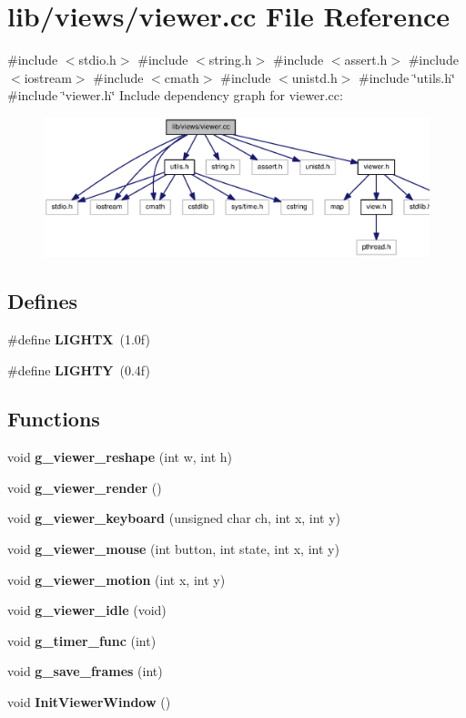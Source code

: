 \section{lib/views/viewer.cc \-File \-Reference}
\label{viewer_8cc}
{\ttfamily \#include $<$stdio.\-h$>$}\*
{\ttfamily \#include $<$string.\-h$>$}\*
{\ttfamily \#include $<$assert.\-h$>$}\*
{\ttfamily \#include $<$iostream$>$}\*
{\ttfamily \#include $<$cmath$>$}\*
{\ttfamily \#include $<$unistd.\-h$>$}\*
{\ttfamily \#include \char`\"{}utils.\-h\char`\"{}}\*
{\ttfamily \#include \char`\"{}viewer.\-h\char`\"{}}\*
\-Include dependency graph for viewer.\-cc\-:
\nopagebreak
\begin{figure}[H]
\begin{center}
\leavevmode
\includegraphics[width=350pt]{viewer_8cc__incl}
\end{center}
\end{figure}
\subsection*{\-Defines}
\begin{DoxyCompactItemize}
\item 
\#define {\bf \-L\-I\-G\-H\-T\-X}~(1.\-0f)
\item 
\#define {\bf \-L\-I\-G\-H\-T\-Y}~(0.\-4f)
\end{DoxyCompactItemize}
\subsection*{\-Functions}
\begin{DoxyCompactItemize}
\item 
void {\bf g\-\_\-viewer\-\_\-reshape} (int w, int h)
\item 
void {\bf g\-\_\-viewer\-\_\-render} ()
\item 
void {\bf g\-\_\-viewer\-\_\-keyboard} (unsigned char ch, int x, int y)
\item 
void {\bf g\-\_\-viewer\-\_\-mouse} (int button, int state, int x, int y)
\item 
void {\bf g\-\_\-viewer\-\_\-motion} (int x, int y)
\item 
void {\bf g\-\_\-viewer\-\_\-idle} (void)
\item 
void {\bf g\-\_\-timer\-\_\-func} (int)
\item 
void {\bf g\-\_\-save\-\_\-frames} (int)
\item 
void {\bf \-Init\-Viewer\-Window} ()
\end{DoxyCompactItemize}


